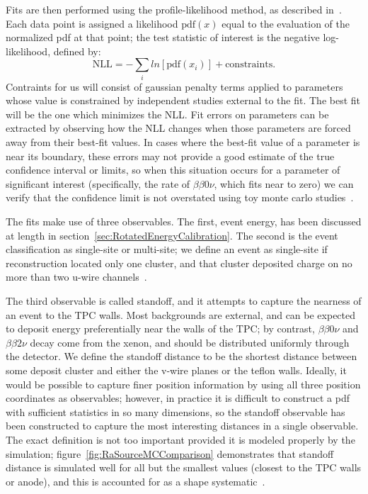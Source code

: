 Fits are then performed using the profile-likelihood method, as described in~\cite{ProfileLikelihood}.  Each data point is assigned a likelihood $\text{pdf}(x)$ equal to the evaluation of the normalized pdf at that point; the test statistic of interest is the negative log-likelihood, defined by:
\begin{equation}
\text{NLL} = -\sum_i ln\left[\text{pdf}(x_i)\right] + \text{constraints}.
\end{equation}
Contraints for us will consist of gaussian penalty terms applied to parameters whose value is constrained by independent studies external to the fit.  The best fit will be the one which minimizes the NLL.  Fit errors on parameters can be extracted by observing how the NLL changes when those parameters are forced away from their best-fit values.  In cases where the best-fit value of a parameter is near its boundary, these errors may not provide a good estimate of the true confidence interval or limits, so when this situation occurs for a parameter of significant interest (specifically, the rate of $\beta\beta 0\nu$, which fits near to zero) we can verify that the confidence limit is not overstated using toy monte carlo studies~\cite{FittingDocument}.

The fits make use of three observables.  The first, event energy, has been discussed at length in section~\ref{sec:RotatedEnergyCalibration}.  The second is the event classification as single-site or multi-site; we define an event as single-site if reconstruction located only one cluster, and that cluster deposited charge on no more than two u-wire channels~\cite{FittingDocument}.

The third observable is called standoff, and it attempts to capture the nearness of an event to the TPC walls.  Most backgrounds are external, and can be expected to deposit energy preferentially near the walls of the TPC; by contrast, $\beta\beta 0\nu$ and $\beta\beta 2\nu$ decay come from the xenon, and should be distributed uniformly through the detector.  We define the standoff distance to be the shortest distance between some deposit cluster and either the v-wire planes or the teflon walls.  Ideally, it would be possible to capture finer position information by using all three position coordinates as observables; however, in practice it is difficult to construct a pdf with sufficient statistics in so many dimensions, so the standoff observable has been constructed to capture the most interesting distances in a single observable.  The exact definition is not too important provided it is modeled properly by the simulation; figure~\ref{fig:RaSourceMCComparison} demonstrates that standoff distance is simulated well for all but the smallest values (closest to the TPC walls or anode), and this is accounted for as a shape systematic~\cite{FittingDocument}.

